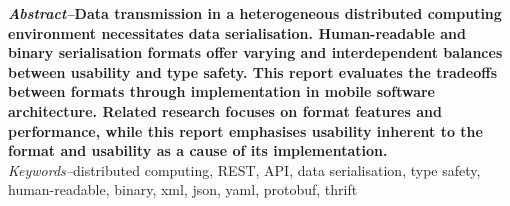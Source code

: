 \documentclass[../report.tex]{subfiles}
\begin{document}
{\textbf{\textit{Abstract--}Data transmission in a heterogeneous distributed computing environment necessitates data serialisation. Human-readable and binary serialisation formats offer varying and interdependent balances between usability and type safety. This report evaluates the tradeoffs between formats through implementation in mobile software architecture. Related research focuses on format features and performance, while this report emphasises usability inherent to the format and usability as a cause of its implementation.}} \\

\textit{Keywords--}distributed computing, REST, API, data serialisation, type safety, human-readable, binary, xml, json, yaml, protobuf, thrift
\end{document}
